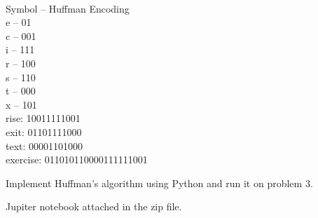 \documentclass[addpoints,11pt]{exam}
\begin{document}
\begin{questions}
\begin{solutionorbox}
\\
Symbol -- Huffman Encoding \\
e -- 01\\
c -- 001\\
i -- 111\\
r -- 100\\
s -- 110\\
t -- 000\\
x -- 101\\

rise: 10011111001\\
exit: 01101111000\\
text: 00001101000\\
exercise: 011010110000111111001\\
\end{solutionorbox}

\ifprintanswers
\newpage
\else
\bigskip
\fi

%
%
\question[15]
Implement Huffman's algorithm using Python and run it on problem 3.
\begin{solutionorbox}
 Jupiter notebook attached in the zip file.
\end{solutionorbox}

\ifprintanswers
\newpage
\else
\bigskip
\fi




\end{questions}
\end{document}
